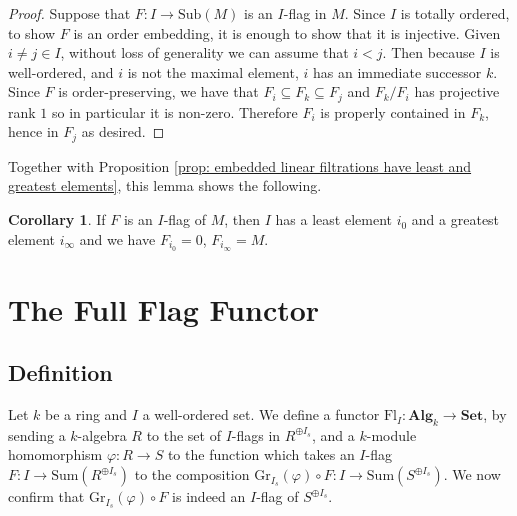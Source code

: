 \documentclass[oneside,11pt]{amsart}
\newcommand{\bSet}{\ensuremath{\textbf{Set}}}
\newcommand{\bAlg}{\ensuremath{\textbf{Alg}}}
\newcommand{\Sum}{\ensuremath{\text{Sum}}}
\newcommand{\Fl}{\ensuremath{\text{Fl}}}
\newcommand{\Sub}{\ensuremath{\text{Sub}}}
\newcommand{\Gr}{\ensuremath{\text{Gr}}}
\theoremstyle{definition}
\newtheorem{proof techniques}{Proof Techniques}
\newtheorem{corollary}{Corollary}
\begin{document}
\begin{proof}
Suppose that $F : I \to \Sub(M)$ is an $I$-flag in $M$. Since $I$ is totally ordered, to show $F$ is an order embedding, it is enough to show that it is injective. Given $i \neq j \in I$, without loss of generality we can assume that $i < j$. Then because $I$ is well-ordered, and $i$ is not the maximal element, $i$ has an immediate successor $k$. Since $F$ is order-preserving, we have that $F_i \subseteq F_k \subseteq F_j$ and $F_k / F_i$ has projective rank $1$ so in particular it is non-zero. Therefore $F_i$ is properly contained in $F_k$, hence in $F_j$ as desired. 
\end{proof}

Together with Proposition \ref{prop: embedded linear filtrations have least and greatest elements}, this lemma shows the following.

\begin{corollary}\label{cor: top and bottom elements of a flag}
If $F$ is an $I$-flag of $M$, then $I$ has a least element $i_0$ and a greatest element $i_\infty$ and we have $F_{i_0} = 0$, $F_{i_\infty} = M$.
\end{corollary}




\section{The Full Flag Functor}\label{sec: full flag functor}

\subsection{Definition}



Let $k$ be a ring and $I$ a well-ordered set. We define a functor $\Fl_I : \bAlg_k \to \bSet$, by sending a $k$-algebra $R$ to the set of $I$-flags in $R^{\oplus I_s}$, and a $k$-module homomorphism $\varphi: R \to S$ to the function which takes an $I$-flag $F : I \to \Sum(R^{\oplus I_s})$ to the composition $\Gr_{I_s}(\varphi) \circ F : I \to \Sum(S^{\oplus I_s})$. We now confirm that $\Gr_{I_s}(\varphi) \circ F$ is indeed an $I$-flag of $S^{\oplus I_s}$. 


\end{document}
